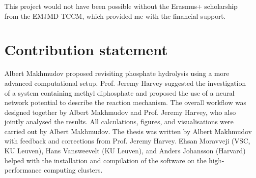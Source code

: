 \par\smallskip
This project would not have been possible without the Erasmus+ scholarship from the EMJMD TCCM, which provided me with the financial support.


\chapter*{Contribution statement}
Albert Makhmudov proposed revisiting phosphate hydrolysis using a more advanced computational setup. Prof. Jeremy Harvey suggested the investigation of a system containing methyl diphosphate and proposed the use of a neural network potential to describe the reaction mechanism. The overall workflow was designed together by Albert Makhmudov and Prof. Jeremy Harvey, who also jointly analysed the results. All calculations, figures, and visualisations were carried out by Albert Makhmudov. The thesis was written by Albert Makhmudov with feedback and corrections from Prof. Jeremy Harvey. Ehsan Moravveji (VSC, KU Leuven), Hans Vansweevelt (KU Leuven), and Anders Johansson (Harvard) helped with the installation and compilation of the software on the high-performance computing clusters.